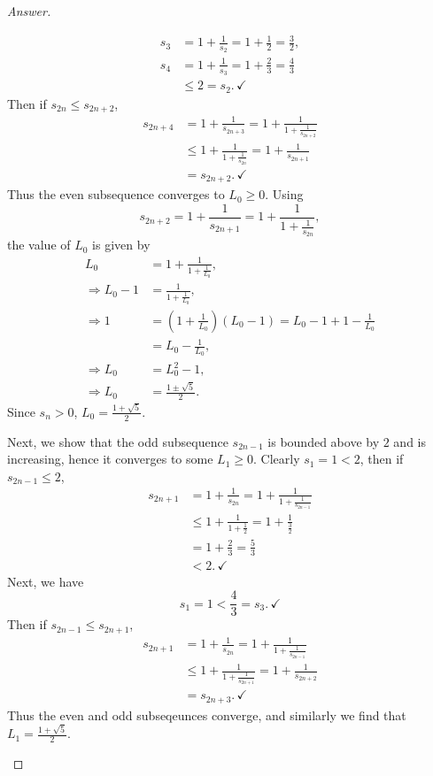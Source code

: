\documentclass[12pt]{article}
\newcommand\paren[1]{\left( #1 \right)}
\theoremstyle{definition}
\begin{document}
\begin{proof}[Answer]
\begin{enumerate}[(I)]
\begin{align*}
            s_3 & = 1 + \frac{1}{s_2} = 1 + \frac{1}{2} =  \frac{3}{2} , \\ 
            s_4 & = 1 + \frac{1}{s_3} = 1 + \frac{2}{3} = \frac{4}{3} \\ 
            & \leq 2 = s_2 . \, \checkmark 
        \end{align*}
        Then if $s_{2n} \leq s_{2n+2}$, 
        \begin{align*}
            s_{2n+4} & = 1 + \frac{1}{s_{2n+3}} = 1 + \frac{1}{ 1 + \frac{1}{s_{2n+2}} } \\ 
            & \leq 1 + \frac{1}{ 1 + \frac{1}{s_{2n}} } = 1 + \frac{1}{s_{2n+1}} \\ 
            & = s_{2n+2} . \, \checkmark 
        \end{align*}
        Thus the even subsequence converges to $L_0 \geq 0$. Using 
        \[
            s_{2n+2} = 1 + \frac{1}{s_{2n+1}} = 1 + \frac{1}{1 + \frac{1}{s_{2n}}} , 
        \]
        the value of $L_0$ is given by 
        \begin{align*}
            L_0 & = 1 + \frac{1}{1 + \frac{1}{L_0}} , \\ 
            \Rightarrow L_0 - 1 & = \frac{1}{1 + \frac{1}{L_0}} , \\ 
            \Rightarrow 1 & = \paren{ 1 + \frac{1}{L_0} }  \paren{ L_0 - 1 } = L_0 - 1 + 1 - \frac{1}{L_0} \\ 
            & = L_0 - \frac{1}{L_0} , \\ 
            \Rightarrow L_0 & = L_0^2 - 1 , \\ 
            \Rightarrow L_0 & = \frac{1 \pm \sqrt{5}}{2} . 
        \end{align*}
        Since $s_n > 0$, $L_0 = \frac{1 + \sqrt{5}}{2}$.
        
        Next, we show that the odd subsequence $s_{2n-1}$ is bounded above by $2$ and is increasing, hence it converges to some $L_1 \geq 0$. Clearly $s_1 = 1 < 2$, then if $s_{2n-1} \leq 2$,
        \begin{align*}
            s_{2n+1} & = 1 + \frac{1}{s_{2n}} = 1 + \frac{1}{ 1 + \frac{1}{s_{2n-1}} } \\ 
            & \leq 1 + \frac{1}{ 1 + \frac{1}{2} } = 1 + \frac{1}{ \frac{3}{2} } \\ 
            & = 1 + \frac{2}{3} = \frac{5}{3} \\ 
            & < 2 . \, \checkmark 
        \end{align*}
        Next, we have 
        \[
            s_1 = 1 < \frac{4}{3} = s_3 . \, \checkmark 
        \]
        Then if $s_{2n-1} \leq s_{2n+1}$, 
        \begin{align*}
            s_{2n+1} & = 1 + \frac{1}{s_{2n}} = 1 + \frac{1}{ 1 + \frac{1}{s_{2n-1}} } \\ 
            & \leq 1 + \frac{1}{ 1 + \frac{1}{s_{2n+1}} } = 1 + \frac{1}{s_{2n+2}} \\ 
            & = s_{2n+3} . \, \checkmark 
        \end{align*}
        Thus the even and odd subseqeunces converge, and similarly we find that $L_1 = \frac{1 + \sqrt{5}}{2}$. 
        

\end{enumerate}
\end{proof}
\end{document}
